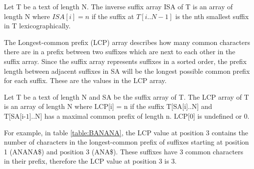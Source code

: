 \begin{definition} 
    Let T be a text of length N.
    The inverse suffix array ISA of T is an array of length N where $ISA[i] = n$ if the
    suffix at $T[i..N-1]$ is the nth smallest suffix in T lexicographically.
\end{definition}

The Longest-common prefix (LCP) array describes how many common characters there are in a
prefix between two suffixes which are next to each other in the suffix array. Since the
suffix array represents suffixes in a sorted order, the prefix length between adjacent
suffixes in SA will be the longest possible common prefix for each suffix. These are the
values in the LCP array.

\begin{definition}
    Let T be a text of length N and SA be the suffix array of T.
    The LCP array of T is an array of length N where $\text{LCP[i] = n}$ if the suffix
    $\text{T[SA[i]..N]}$ and $\text{T[SA[i-1]..N]}$ has a maximal common prefix of length
    $\text{n}$. $\text{LCP[0]}$ is undefined or {0}.
\end{definition}

For example, in table \ref{table:BANANA}, the LCP value at position 3 contains the number
of characters in the longest-common prefix of suffixes starting at position 1 (ANANA\$)
and position 3 (ANA\$). These suffixes have 3 common characters in their prefix, therefore
the LCP value at position 3 is 3.

